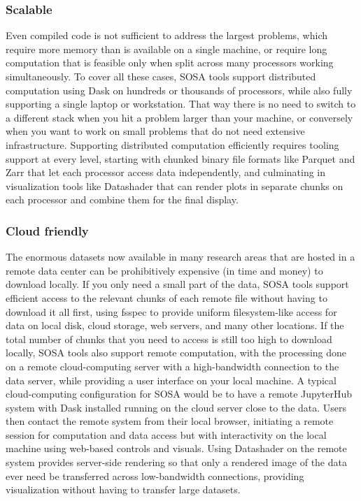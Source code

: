 \subsubsection{Scalable}
Even compiled code is not sufficient to address the largest problems, which require more memory than is available on a single machine, or require long computation that is feasible only when split across many processors working simultaneously. To cover all these cases, SOSA tools support distributed computation using Dask on hundreds or thousands of processors, while also fully supporting a single laptop or workstation. That way there is no need to switch to a different stack when you hit a problem larger than your machine, or conversely when you want to work on small problems that do not need extensive infrastructure. Supporting distributed computation efficiently requires tooling support at every level, starting with chunked binary file formats like Parquet and Zarr that let each processor access data independently, and culminating in visualization tools like Datashader that can render plots in separate chunks on each processor and combine them for the final display.

\subsubsection{Cloud friendly}
The enormous datasets now available in many research areas that are hosted in a remote data center can be prohibitively expensive (in time and money) to download locally. If you only need a small part of the data, SOSA tools support efficient access to the relevant chunks of each remote file without having to download it all first, using fsspec to provide uniform filesystem-like access for data on local disk, cloud storage, web servers, and many other locations. If the total number of chunks that you need to access is still too high to download locally, SOSA tools also support remote computation, with the processing done on a remote cloud-computing server with a high-bandwidth connection to the data server, while providing a user interface on your local machine. A typical cloud-computing configuration for SOSA would be to have a remote JupyterHub system with Dask installed running on the cloud server close to the data. Users then contact the remote system from their local browser, initiating a remote session for computation and data access but with interactivity on the local machine using web-based controls and visuals. Using Datashader on the remote system provides server-side rendering so that only a rendered image of the data ever need be transferred across low-bandwidth connections, providing visualization without having to transfer large datasets.

